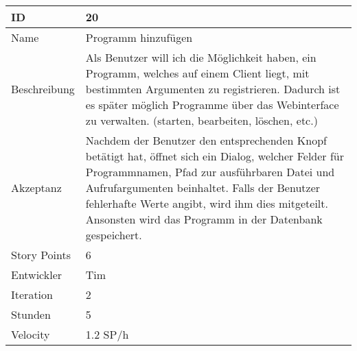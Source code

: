 \begin{table}[htbp]
    \begin{minipage}{\linewidth}
        \setlength{\tymax}{0.5\linewidth}
        \centering
        \small
        \begin{tabulary}{\textwidth}{|l|p{10cm}|} \hline
            ID   &20\\\hline
            Name  &Programm hinzufügen\\\hline
	    Beschreibung&Als Benutzer will ich die Möglichkeit haben, ein Programm, welches auf einem Client liegt, mit bestimmten Argumenten zu registrieren. Dadurch ist es später möglich Programme über das Webinterface zu verwalten. (starten, bearbeiten, löschen, etc.)\\\hline
	    Akzeptanz &Nachdem der Benutzer den entsprechenden Knopf betätigt hat, öffnet sich ein Dialog, welcher Felder für Programmnamen, Pfad zur ausführbaren Datei und Aufrufargumenten beinhaltet. Falls der Benutzer fehlerhafte Werte angibt, wird ihm dies mitgeteilt. Ansonsten wird das Programm in der Datenbank gespeichert.\\\hline
            Story Points&6\\\hline
            Entwickler &Tim\\\hline
            Iteration &2\\\hline
            Stunden  &5\\\hline
            Velocity &1.2 SP\slash h\\\hline
        \end{tabulary}
    \end{minipage}
\end{table}



